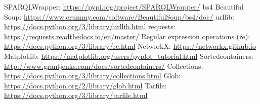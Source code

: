 \documentclass[12pt, twoside]{article}
\def\blankpage{%
      \clearpage%
      \thispagestyle{empty}%
      \addtocounter{page}{-1}%
      \null%
      \clearpage}
\let\oldlstlistoflistings\lstlistoflistings
\renewcommand{\lstlistoflistings}{%
  \begingroup%
  \let\oldnumberline\numberline%
  \renewcommand{\numberline}{\lstlistingname~\oldnumberline}%
  \oldlstlistoflistings%
  \endgroup}
\begin{document}
\newpage
\blankpage

\begin{thebibliography}{X} %
	SPARQLWrapper: \href{https://pypi.org/project/SPARQLWrapper/}{https://pypi.org/project/SPARQLWrapper/}
 bs4 Beautiful Soup: \href{https://www.crummy.com/software/BeautifulSoup/bs4/doc/}{https://www.crummy.com/software/BeautifulSoup/bs4/doc/}
 urllib: \href{https://docs.python.org/3/library/urllib.html}{https://docs.python.org/3/library/urllib.html}
 requests: \href{https://requests.readthedocs.io/en/master/}{https://requests.readthedocs.io/en/master/}
 Regular expression operations (re): \href{https://docs.python.org/3/library/re.html}{https://docs.python.org/3/library/re.html}
 NetworkX: \href{https://networkx.github.io}{https://networkx.github.io}
 Matplotlib: \href{https://matplotlib.org/users/pyplot\_tutorial.html}{https://matplotlib.org/users/pyplot\_tutorial.html}
 Sortedcontainers: \href{http://www.grantjenks.com/docs/sortedcontainers/}{http://www.grantjenks.com/docs/sortedcontainers/}
 Collections: \href{https://docs.python.org/3/library/collections.html}{https://docs.python.org/3/library/collections.html}
 Glob: \href{https://docs.python.org/2/library/glob.html}{https://docs.python.org/2/library/glob.html}
 Tarfile: \href{https://docs.python.org/3/library/tarfile.html}{https://docs.python.org/3/library/tarfile.html}

\end{thebibliography}

\newpage
\listoffigures
\lstlistoflistings
\end{document}
